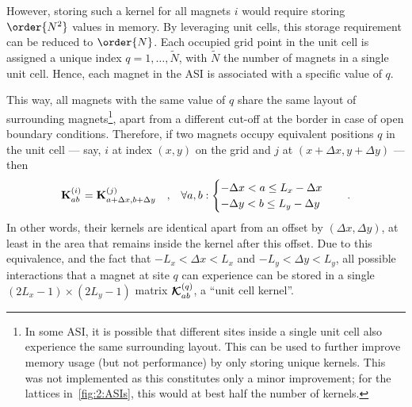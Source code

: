 However, storing such a kernel for all magnets $i$ would require storing $\order{N^2}$ values in memory.
By leveraging unit cells, this storage requirement can be reduced to $\order{N}$.
Each occupied grid point in the unit cell is assigned a unique index $q = 1,\dots,\widetilde{N}$, with $\widetilde{N}$ the number of magnets in a single unit cell.
Hence, each magnet in the ASI is associated with a specific value of $q$. \par
This way, all magnets with the same value of $q$ share the same layout of surrounding magnets\footnote{
	In some ASI, it is possible that different sites inside a single unit cell also experience the same surrounding layout.
	This can be used to further improve memory usage (but not performance) by only storing unique kernels.
	This was not implemented as this constitutes only a minor improvement; for the lattices in~\cref{fig:2:ASIs}, this would at best half the number of kernels.
}, apart from a different cut-off at the border in case of open boundary conditions.
Therefore, if two magnets occupy equivalent positions $q$ in the unit cell --- say, $i$ at index $(x,y)$ on the grid and $j$ at $(x+\Delta x, y+\Delta y)$ --- then
\begin{equation}
	\label{eq:2:Kernel_equivalence}
	\boldsymbol{\mathbf{K}}^{(i)}_{ab} = \boldsymbol{\mathbf{K}}^{(j)}_{a+\Delta x,b+\Delta y} \quad \mathrm{,} \quad \forall a,b:
	\begin{cases}
		-\Delta x < a \leq L_x - \Delta x \\
		-\Delta y < b \leq L_y - \Delta y \\
	\end{cases} \quad\mathrm{.}
\end{equation}
In other words, their kernels are identical apart from an offset by $(\Delta x, \Delta y)$, at least in the area that remains inside the kernel after this offset.
Due to this equivalence, and the fact that $- L_x < \Delta x < L_x$ and $- L_y < \Delta y < L_y$, all possible interactions that a magnet at site $q$ can experience can be stored in a single $(2L_x-1) \times (2L_y-1)$ matrix $\boldsymbol{\mathbf{\mathcal{K}}}^{(q)}_{ab}$, a ``unit cell kernel''.

